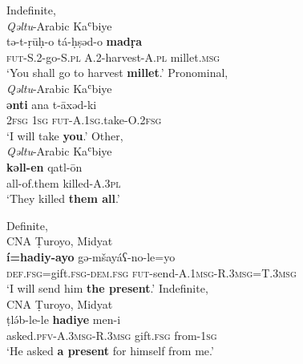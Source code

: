 \documentclass[output=paper,colorlinks,citecolor=brown,draftmode]{langscibook}
\begin{document}
\ex\label{Arabic:ex:15b}
Indefinite, \\
\textit{Qəltu}-Arabic Kaʿbiye \citep[II:§5]{Jastrow2022CADiyarbakir} \\
\gll tə-t-ṛūḥ-o tá-ḥṣəd-o \textbf{madṛa} \\
     \textsc{fut-S.2-}go\textsc{-S.pl} \textsc{A.2-}harvest\textsc{-A.pl} millet\textsc{.msg} \\
\glt `You shall go to harvest \textbf{millet}.'
\newpage
\ex\label{Arabic:ex:15c}
Pronominal, \\
\textit{Qəltu}-Arabic Kaʿbiye \citep[XIV:§2]{Jastrow2022CADiyarbakir} \\
\gll \textbf{ənti} ana t-āxəd-ki \\
     \textsc{2fsg} \textsc{1sg} \textsc{fut-A.1sg.}take\textsc{-O.2fsg} \\
\glt `I will take \textbf{you}.'
\ex\label{Arabic:ex:15d}
Other, \\
\textit{Qəltu}-Arabic Kaʿbiye \citep[II:§7]{Jastrow2022CADiyarbakir} \\
\gll \textbf{kəll-en} qatl-ōn \\
     all-of.them killed\textsc{-A.3pl} \\
\glt `They killed \textbf{them all}.'
\z
\z

\ea
\ea\label{Arabic:ex:16a}
Definite, \\
CNA Ṭuroyo, Midyat \citep[27:§25]{Ritter1967Turoyo} \\
\gll \textbf{í=hadiy-ayo} gə-mšayáʕ-no-le=yo \\
     \textsc{def.fsg=}gift\textsc{.fsg-dem.fsg} \textsc{fut-}send\textsc{-A.1msg}\textsc{-R.3msg}\textsc{=T.3msg} \\
\glt `I will send him \textbf{the present}.'
\ex\label{Arabic:ex:16b}
Indefinite, \\
CNA Ṭuroyo, Midyat \citep[27:§25]{Ritter1967Turoyo} \\
\gll ṭlə́b-le-le \textbf{hadiye} men-i \\
     asked\textsc{.pfv-A.3msg}\textsc{-R.3msg} gift\textsc{.fsg} from\textsc{-1sg}  \\
\glt `He asked \textbf{a present} for himself from me.'
\end{document}
